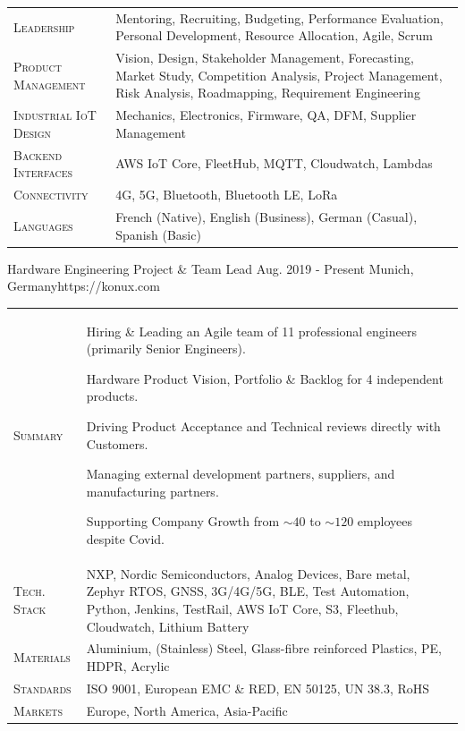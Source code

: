 \documentclass[10pt,a4paper]{moderncv}
\begin{document}

  \begin{tabularx}{\textwidth}{>{\scshape}l@{\hskip 3.5mm}L}
    Leadership & Mentoring, Recruiting, Budgeting, Performance Evaluation, Personal Development, Resource Allocation, Agile, Scrum\\
    Product Management & Vision, Design, Stakeholder Management, Forecasting, Market Study, Competition Analysis, Project Management, Risk Analysis, Roadmapping, Requirement Engineering\\
    Industrial IoT Design & Mechanics, Electronics, Firmware, QA, DFM, Supplier Management\\
    Backend Interfaces & AWS IoT Core, FleetHub, MQTT, Cloudwatch,  Lambdas\\
    Connectivity & 4G, 5G, Bluetooth, Bluetooth LE, LoRa\\
    Languages & French (Native), English (Business), German (Casual), Spanish (Basic)
  \end{tabularx}


    {Hardware Engineering Project \& Team Lead}
    {Aug. 2019 - Present}
    {Munich, Germany}{https://konux.com}

  \begin{tabularx}{\textwidth}{>{\scshape}l@{\hskip 3.5mm}L}
    Summary & Hiring \& Leading an Agile team of 11 professional engineers (primarily Senior Engineers).
    \par Hardware Product Vision, Portfolio \& Backlog for 4 independent products.
    \par Driving Product Acceptance and Technical reviews directly with Customers.
    \par Managing external development partners, suppliers, and manufacturing partners.
    \par Supporting Company Growth from $\sim 40$ to $\sim 120$ employees despite Covid.\\
    Tech. Stack & NXP, Nordic Semiconductors, Analog Devices, Bare metal, Zephyr RTOS, GNSS, 3G/4G/5G, BLE, Test Automation, Python, Jenkins, TestRail, AWS IoT Core, S3, Fleethub, Cloudwatch, Lithium Battery\\
    Materials &  Aluminium, (Stainless) Steel, Glass-fibre reinforced Plastics, PE, HDPR, Acrylic\\
    Standards & ISO 9001, European EMC \& RED, EN 50125, UN 38.3, RoHS\\
    Markets & Europe, North America, Asia-Pacific\\
  \end{tabularx}
\end{document}
